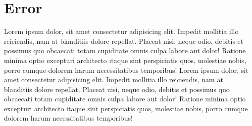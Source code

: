 \section{Error}
	Lorem ipsum dolor, sit amet consectetur adipisicing elit. Impedit mollitia illo reiciendis, nam at blanditiis dolore repellat. Placeat nisi, neque odio, debitis et possimus quo obcaecati totam cupiditate omnis culpa labore aut dolor! Ratione minima optio excepturi architecto itaque sint perspiciatis quos, molestiae nobis, porro cumque dolorem harum necessitatibus temporibus! Lorem ipsum dolor, sit amet consectetur adipisicing elit. Impedit mollitia illo reiciendis, nam at blanditiis dolore repellat. Placeat nisi, neque odio, debitis et possimus quo obcaecati totam cupiditate omnis culpa labore aut dolor! Ratione minima optio excepturi architecto itaque sint perspiciatis quos, molestiae nobis, porro cumque dolorem harum necessitatibus temporibus!
